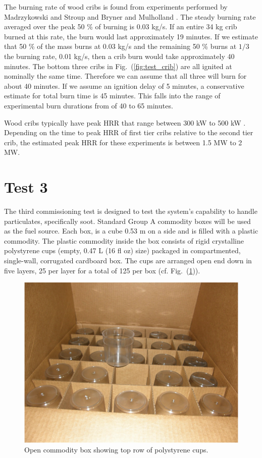 \documentclass[12pt,oneside]{book}
\begin{document}
The burning rate of wood cribs is found from experiments performed by Madrzykowski and Stroup \cite{Madrzykowski1998} and Bryner and Mulholland \cite{Bryner1991}. The steady burning rate averaged over the peak 50 \% of burning is 0.03 kg/s. If an entire 34 kg crib burned at this rate, the burn would last approximately 19 minutes. If we estimate that 50 \% of the mass burns at 0.03 kg/s and the remaining 50 \% burns at $1/3$ the burning rate, 0.01 kg/s, then a crib burn would take approximately 40 minutes. The bottom three cribs in Fig.~(\ref{fig:test_crib}) are all ignited at nominally the same time. Therefore we can assume that all three will burn for about 40 minutes. If we assume an ignition delay of 5 minutes, a conservative estimate for total burn time is 45 minutes. This falls into the range of experimental burn durations from \cite{Bryner1991} of 40 to 65 minutes.

Wood cribs typically have peak HRR that range between 300 kW to 500 kW \cite{Madrzykowski1998,Bryner1991}. Depending on the time to peak HRR of first tier cribs relative to the second tier crib, the estimated peak HRR for these experiments is between 1.5 MW to 2 MW. 

\section{Test 3}
\label{test3}
The third commissioning test is designed to test the system's capability to handle particulates, specifically soot. Standard Group A commodity boxes will be used as the fuel source. Each box, is a cube 0.53 m on a side and is filled with a plastic commodity. The plastic commodity inside the box consists of rigid crystalline polystyrene cups (empty, 0.47 L (16 fl oz) size) packaged in compartmented, single-wall, corrugated cardboard box. The cups are arranged open end down in five layers, 25 per layer for a total of 125 per box (cf. Fig.~(\ref{fig:open_box})).

\begin{figure}
\centering
\includegraphics[width=.7\textwidth]{../Figures/open_box}
\caption {Open commodity box showing top row of polystyrene cups.}
\label{fig:open_box}
\end{figure}
\end{document}
